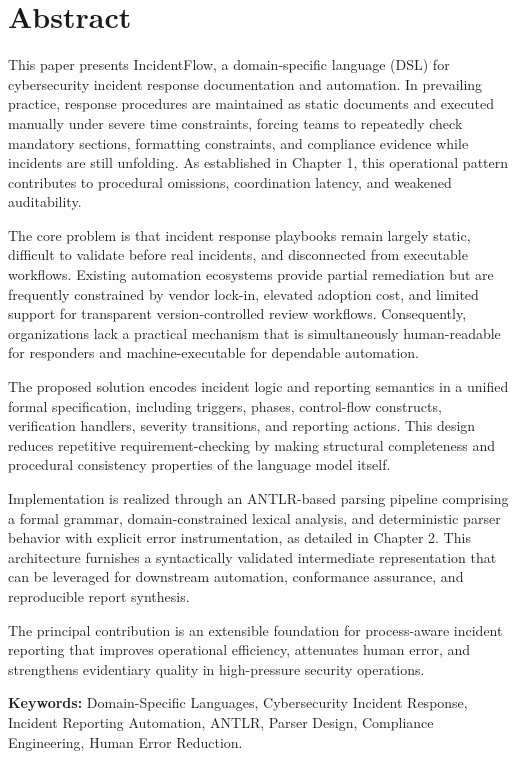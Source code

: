 \chapter*{Abstract}

This paper presents IncidentFlow, a domain-specific language (DSL) for cybersecurity incident response documentation and automation. In prevailing practice, response procedures are maintained as static documents and executed manually under severe time constraints, forcing teams to repeatedly check mandatory sections, formatting constraints, and compliance evidence while incidents are still unfolding. As established in Chapter 1, this operational pattern contributes to procedural omissions, coordination latency, and weakened auditability.

The core problem is that incident response playbooks remain largely static, difficult to validate before real incidents, and disconnected from executable workflows. Existing automation ecosystems provide partial remediation but are frequently constrained by vendor lock-in, elevated adoption cost, and limited support for transparent version-controlled review workflows. Consequently, organizations lack a practical mechanism that is simultaneously human-readable for responders and machine-executable for dependable automation.

The proposed solution encodes incident logic and reporting semantics in a unified formal specification, including triggers, phases, control-flow constructs, verification handlers, severity transitions, and reporting actions. This design reduces repetitive requirement-checking by making structural completeness and procedural consistency properties of the language model itself.

Implementation is realized through an ANTLR-based parsing pipeline comprising a formal grammar, domain-constrained lexical analysis, and deterministic parser behavior with explicit error instrumentation, as detailed in Chapter 2. This architecture furnishes a syntactically validated intermediate representation that can be leveraged for downstream automation, conformance assurance, and reproducible report synthesis.

The principal contribution is an extensible foundation for process-aware incident reporting that improves operational efficiency, attenuates human error, and strengthens evidentiary quality in high-pressure security operations.

\textbf{Keywords: } Domain-Specific Languages, Cybersecurity Incident Response, Incident Reporting Automation, ANTLR, Parser Design, Compliance Engineering, Human Error Reduction.
